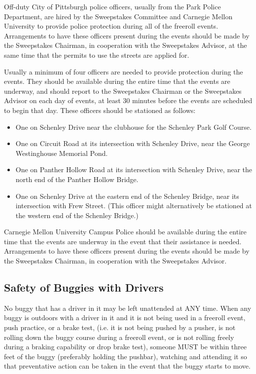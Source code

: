 	Off-duty City of Pittsburgh police officers, usually from the Park Police Department, are hired by the Sweepstakes Committee and Carnegie Mellon University to provide police protection during all of the freeroll events. Arrangements to have these officers present during the events should be made by the Sweepstakes Chairman, in cooperation with the Sweepstakes Advisor, at the same time that the permits to use the streets are applied for.

	Usually a minimum of four officers are needed to provide protection during the events. They should be available during the entire time that the events are underway, and should report to the Sweepstakes Chairman or the Sweepstakes Advisor on each day of events, at least 30 minutes before the events are scheduled to begin that day. These officers should be stationed as follows:

	\begin{itemize}

		\item One on Schenley Drive near the clubhouse for the Schenley Park Golf Course.

		\item One on Circuit Road at its intersection with Schenley Drive, near the George Westinghouse Memorial Pond.

		\item One on Panther Hollow Road at its intersection with Schenley Drive, near the north end of the Panther
		Hollow Bridge.	

		\item One on Schenley Drive at the eastern end of the Schenley Bridge, near its intersection with Frew Street. (This officer might alternatively be stationed at the western end of the Schenley Bridge.)

	\end{itemize}

	Carnegie Mellon University Campus Police should be available during the entire time that the events are underway in the event that their assistance is needed. Arrangements to have these officers present during the events should be made by the Sweepstakes Chairman, in cooperation with the Sweepstakes Advisor.	
	
\subsection{Safety of Buggies with Drivers}
\label{ssec:SafetyBuggyDriver}
	No buggy that has a driver in it may be left unattended at ANY time. When any buggy is outdoors with a driver in it and it is not being used in a freeroll event, push practice, or a brake test, (i.e. it is not being pushed by a pusher, is not rolling down the buggy course during a freeroll event, or is not rolling freely during a braking capability or drop brake test), someone MUST be within three feet of the buggy (preferably holding the pushbar), watching and attending it so that preventative action can be taken in the event that the buggy starts to move.
	
